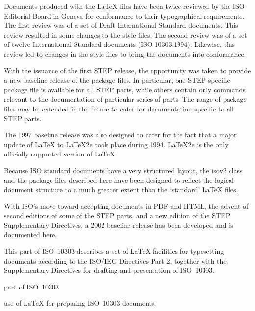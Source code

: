 \documentclass[wd,copyright,letterpaper]{isov2}
\makeatletter
\newcommand{\file}[1]{\textsf{#1}}
\newcommand{\ixltx}{\index{latex@\LaTeX}}
\newcommand{\latex}{LaTeX}
\makeatother
\begin{document}
\begin{Introduction}
    Documents produced with the \latex{} files have been twice reviewed 
by the ISO Editorial Board in Geneva for conformance to their 
typographical requirements. The first review was of a set of Draft 
International Standard documents. This review resulted in some changes 
to the style files. The second review was of a set of twelve 
International Standard documents (ISO 10303:1994). Likewise, this
review led to changes in the style files to bring the documents into 
conformance.

    With the issuance of the first STEP release, the opportunity was 
taken to provide a new baseline release of the package files. 
In particular, one STEP specific package file is available for all 
STEP parts, while others contain only commands relevant to the 
documentation of particular series of parts. The range of package 
files may be extended in the future to cater for 
documentation specific to all STEP parts.

   The 1997 baseline release was also designed to cater for the 
fact that a major update of \latex{} to \latex 2e took place during 1994.
\latex 2e is the only officially supported version of \latex.

    Because ISO standard documents have a very structured layout, the 
\file{isov2} class and the package files described here have been 
designed to reflect the logical document structure to a much greater 
extent than the `standard' \latex{} files. 

    With ISO's move toward accepting documents in PDF and HTML, 
the advent of second
editions of some of the STEP parts, and a new edition of the STEP
Supplementary Directives, a 2002
baseline release has been developed and is documented here. 



\end{Introduction}



\scopeclause

This part of ISO~10303 describes a set of \ixltx\latex{} facilities for typesetting
documents according to the ISO/IEC Directives Part 2, together with the 
Supplementary Directives for drafting and presentation of ISO~10303.

\begin{inscope}{part of ISO~10303}
\item use of \latex{} for preparing ISO~10303 documents.
\end{inscope}
\end{document}
